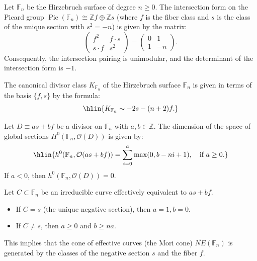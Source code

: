\begin{theorem}
Let $\mathbb{F}_n$ be the Hirzebruch surface of degree $n \ge 0$. The intersection form on the Picard group $\operatorname{Pic}(\mathbb{F}_n) \cong \mathbb{Z} f \oplus \mathbb{Z} s$ (where $f$ is the fiber class and $s$ is the class of the unique section with $s^2 = -n$) is given by the matrix:
$$
\begin{pmatrix}
f^2 & f \cdot s \\
s \cdot f & s^2
\end{pmatrix}
=
\begin{pmatrix}
0 & 1 \\
1 & -n
\end{pmatrix}.
$$
Consequently, the intersection pairing is unimodular, and the determinant of the intersection form is $-1$.
\end{theorem}

\begin{theorem}
The canonical divisor class $K_{\mathbb{F}_n}$ of the Hirzebruch surface $\mathbb{F}_n$ is given in terms of the basis $\{f, s\}$ by the formula:
$$\hlin{K_{\mathbb{F}_n} \sim -2s - (n+2)f.}$$
\end{theorem}

\begin{theorem}
Let $D \equiv a s + b f$ be a divisor on $\mathbb{F}_n$ with $a, b \in \mathbb{Z}$. The dimension of the space of global sections $H^0(\mathbb{F}_n, \mathcal{O}(D))$ is given by:
$$\hlin{h^0(\mathbb{F}_n, \mathcal{O}(as+bf)) = \sum_{i=0}^a \max(0, b - ni + 1), \quad \text{if } a \ge 0.}$$
If $a < 0$, then $h^0(\mathbb{F}_n, \mathcal{O}(D)) = 0$.
\end{theorem}

\begin{proposition}
Let $C \subset \mathbb{F}_n$ be an irreducible curve effectively equivalent to $as + bf$.
\begin{itemize}
    \item If $C = s$ (the unique negative section), then $a=1, b=0$.
    \item If $C \neq s$, then $a \ge 0$ and $b \ge na$.
\end{itemize}
This implies that the cone of effective curves (the Mori cone) $\overline{NE}(\mathbb{F}_n)$ is generated by the classes of the negative section $s$ and the fiber $f$.
\end{proposition}



